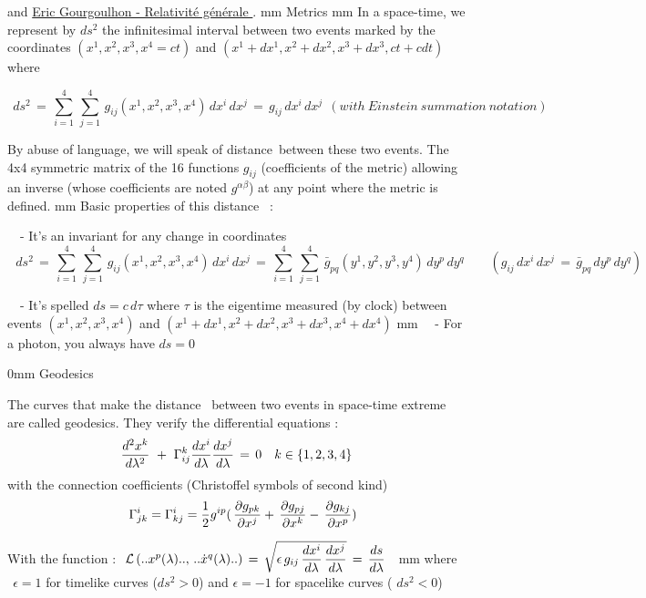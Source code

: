 \documentclass [12pt]{article}
\def\pv#1{\vskip #1}
\begin{document}
		and \href{https://luth.obspm.fr/~luthier/gourgoulhon/fr/master/relatM2.pdf}{\textcolor{bleu}{Eric Gourgoulhon - Relativit\'e g\'en\'erale } } .
		\pv 3mm
		{ Metrics} \pv2mm  
				  In a space-time, we represent by $ds^2$ the infinitesimal interval between two events marked by the coordinates $(x^1, x^2,x^3,x^4=ct)$ and $(x^1+dx^1, x^2+dx^2,x^3+dx^3,ct+cdt)$ where

		$$\ \ ds^2\,=\,\displaystyle \sum ^4_{i=1}\,\sum ^4_{j=1}\,g_{ij}(x^1,x^2,x^3,x^4)\,dx^i\,dx^j\,=\,g_{ij}\,dx^i\,dx^j \ \ (with\  Einstein\  summation\  notation) $$
		
		By abuse of language, we will speak of \og distance \fg \,between these two events.
		The 4x4 symmetric matrix of the 16 functions $g_{ij}$ (coefficients of the metric) allowing an inverse (whose coefficients are noted $g^{\alpha\beta}$) at any point where the metric is defined.
		\pv 2mm
		Basic properties of this \og distance \fg \, :

		  $\ \ \ $     - It's an invariant for any change in coordinates
			$$\ \ \ ds^2\,=\,\displaystyle \sum ^4_{i=1}\,\sum ^4_{j=1}\, g_{ij}(x^1,x^2,x^3,x^4)\,dx^i\,dx^j\,=
		\,\displaystyle \sum ^4_{i=1}\,\sum ^4_{j=1}\,\bar g_{pq}(y^1,y^2,y^3,y^4)\,dy^p\,dy^q \ \ \ \ \ \ \ \ \ (g_{ij}\,dx^i\,dx^j\,=\,\bar g_{pq}\,dy^p\,dy^q)  $$

		    $\ \ \ $   - It's spelled $ds=c\,d\tau$ where $\tau$ is the eigentime measured (by clock) between events $(x^1, x^2,x^3,x^4)$ and $(x^1+dx^1, x^2+dx^2,x^3+dx^3,x^4+dx^4)$ 
				\pv 2mm
		   $\ \ \ $   - For a photon, you always have $ds=0$  

		 \pv 50mm 
		 { Geodesics} 
	 
		The curves that make the \og distance \fg \, between two events in space-time extreme are called geodesics. They verify the differential equations :
		$$\ \ \ \displaystyle{d^2x^k\over d\lambda^2}\ +\ \Gamma_{ij}^k{dx^i\over d\lambda}{dx^j\over d\lambda}\, =\,0\ \ \ k\in\{1,2,3,4\} \ \ \ $$
		with the connection coefficients (Christoffel symbols of second kind)
		$$\ \ \ \displaystyle \Gamma_{jk}^i=\Gamma_{kj}^i={1\over 2}g^{ip}(\,{\partial g_{pk} \over  \partial x^j} +\,{\partial g_{pj} \over  \partial x^k}-\,{\partial g_{kj} \over  \partial x^p})$$ 

		With the function :$\ \ \mathcal L \,(..x^p(\lambda)..,\,..\dot x^q(\lambda)..)\,=\,\displaystyle \sqrt {\epsilon\,g_{ij}\,{ dx^i\over d\lambda}\,{dx^j\over d\lambda} }\,=\,{ds\over d\lambda}\ \  $
		\pv 4mm
		 where $\ \ \epsilon=1$ for timelike curves ($ds^2>0$) and $\epsilon=-1$ for spacelike curves ( $ds^2<0$) 
		
\end{document}

